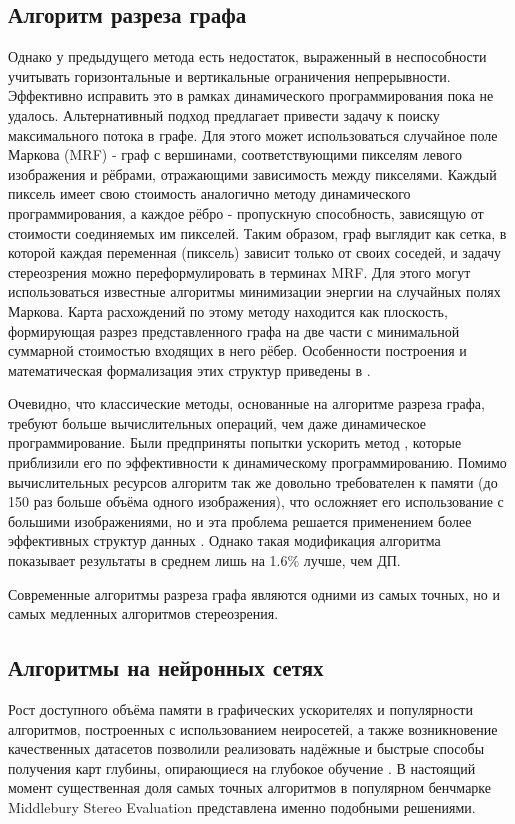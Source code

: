 \subsection{Алгоритм разреза графа}
Однако у предыдущего метода есть недостаток, выраженный в неспособности учитывать горизонтальные и вертикальные ограничения непрерывности. Эффективно исправить это в рамках динамического 
программирования пока не удалось. Альтернативный подход предлагает привести задачу к поиску максимального потока в графе. Для этого может использоваться случайное поле Маркова (MRF) - граф с вершинами, 
соответствующими пикселям левого изображения и рёбрами, отражающими зависимость между пикселями. Каждый пиксель имеет свою стоимость аналогично методу динамического программирования, а каждое рёбро - пропускную способность, 
зависящую от стоимости соединяемых им пикселей. Таким образом, граф выглядит как сетка, в которой каждая переменная (пиксель) зависит только от своих соседей, и задачу стереозрения можно переформулировать в терминах MRF.  
Для этого могут использоваться известные алгоритмы минимизации энергии на случайных полях Маркова. Карта расхождений по этому методу находится как плоскость, формирующая разрез представленного графа на две части с минимальной 
суммарной стоимостью входящих в него рёбер. Особенности построения и математическая формализация этих структур приведены в \cite{graphcut,gc_ocl}. 

Очевидно, что классические методы, основанные на алгоритме разреза графа, требуют больше вычислительных операций, чем даже динамическое программирование. Были предприняты попытки ускорить метод \cite{fast_gc,graphcut}, 
которые приблизили его по эффективности к динамическому программированию. Помимо вычислительных ресурсов алгоритм так же довольно требователен к памяти (до  150 раз больше объёма одного изображения), что осложняет его использование 
с большими изображениями, но и эта проблема решается применением более эффективных структур данных \cite{effic_gc}. Однако такая модификация алгоритма показывает результаты в среднем лишь на 1.6\%  лучше, чем ДП. 

Современные алгоритмы разреза графа являются одними из самых точных, но и самых медленных алгоритмов стереозрения.

\subsection{Алгоритмы на нейронных сетях}

Рост доступного объёма памяти в графических ускорителях и популярности алгоритмов, построенных с использованием неиросетей, а также возникновение качественных датасетов позволили реализовать надёжные и быстрые способы 
получения карт глубины, опирающиеся на глубокое обучение \cite{neural_review}. В настоящий момент существенная доля самых точных алгоритмов в популярном бенчмарке Middlebury Stereo Evaluation \cite{stereo_bench} представлена именно
подобными решениями. 

